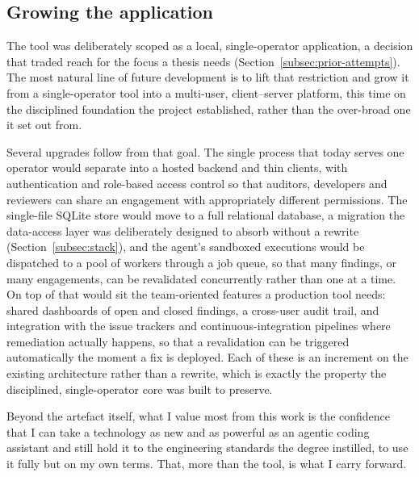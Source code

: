 \subsection{Growing the application}
\label{sec:scaling}

The tool was deliberately scoped as a local, single-operator application, a
decision that traded reach for the focus a thesis needs
(Section~\ref{subsec:prior-attempts}). The most natural line of future development is
to lift that restriction and grow it from a single-operator tool into a multi-user,
client--server platform, this time on the disciplined foundation the project
established, rather than the over-broad one it set out from.

Several upgrades follow from that goal. The single process that today serves one
operator would separate into a hosted backend and thin clients, with authentication
and role-based access control so that auditors, developers and reviewers can share an
engagement with appropriately different permissions. The single-file SQLite store
would move to a full relational database, a migration the data-access layer was
deliberately designed to absorb without a rewrite (Section~\ref{subsec:stack}), and
the agent's sandboxed executions would be dispatched to a pool of workers through a
job queue, so that many findings, or many engagements, can be revalidated concurrently
rather than one at a time. On top of that would sit the team-oriented features a
production tool needs: shared dashboards of open and closed findings, a cross-user
audit trail, and integration with the issue trackers and continuous-integration
pipelines where remediation actually happens, so that a revalidation can be triggered
automatically the moment a fix is deployed. Each of these is an increment on the
existing architecture rather than a rewrite, which is exactly the property the
disciplined, single-operator core was built to preserve.

\medskip
Beyond the artefact itself, what I value most from this work is the confidence that I
can take a technology as new and as powerful as an agentic coding assistant and still
hold it to the engineering standards the degree instilled, to use it fully but on
my own terms. That, more than the tool, is what I carry forward.
